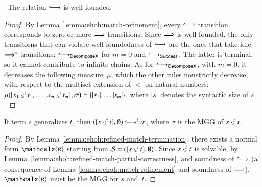 \begin{lemma}\label{lemma:ehoh:refined-match-termination}\,%
  The relation $\Matchiiarrow$ is well founded.
  \end{lemma}
\begin{proof}
  By Lemma \ref{lemma:ehoh:match-refinement}, every $\Matchiiarrow$ transition
  corresponds to zero or more $\Longrightarrow$ transitions.
  Since $\Longrightarrow$ is well founded,
  the only transitions that can violate well-foundedness of $\Matchiiarrow$ are
  the ones that take idle $\Longrightarrow^*$ transitions:
  $\Matchiiarrow_{\mathsf{DecomposeX}}$ for $m=0$ and
  $\Matchiiarrow_{\mathsf{Success}}$. The latter is terminal, so it cannot
  contribute to infinite chains.
  As for $\Matchiiarrow_{\mathsf{DecomposeX}}$, with $m=0$,
  it decreases the following measure~$\mu$, which the other rules nonstrictly
  decrease, with respect to the multiset extension of $<$ on natural numbers:
  $\mu([s_1 \MATCH t_1, \ldots, s_m \MATCH t_m], \sigma) =
    \{\left|s_1\right|, \ldots \left|s_m\right|\}$,
  where $\left|s\right|$ denotes the syntactic size of $s$.
\end{proof}
  
\begin{lemma}\label{lemma:ehoh:refined-matching-solution}
  If term $s$ generalizes $t$, then $([s \MATCH t], \emptyset) \Matchiiarrow^! \sigma$,
  where $\sigma$ is the MGG of $s \mathrel{{\scriptstyle\lesssim}^{\scriptscriptstyle{?\!}}} t$.
\end{lemma}
\begin{proof}
By Lemma \ref{lemma:ehoh:refined-match-termination}, there exists a normal form
$\mathcalx{R}$ starting from $\mathcal{S} = ([s \mathrel{{\scriptstyle\lesssim}^{\scriptscriptstyle{?\!}}} t],\allowbreak \emptyset)$. Since $s
\mathrel{{\scriptstyle\lesssim}^{\scriptscriptstyle{?\!}}} t$ is solvable, by Lemma~\ref{lemma:ehoh:refined-match-partial-correctness},
and soundness of $\Matchiiarrow$ (a consequence of Lemma \ref{lemma:ehoh:match-refinement}
and soundness of $\Longrightarrow$),
$\mathcalx{R}$ must be the MGG for $s$ and~$t$.
\end{proof}



